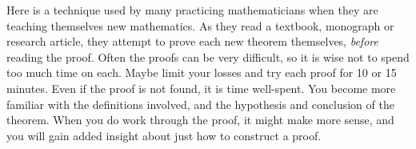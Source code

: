 \begin{para}Here is a technique used by many practicing mathematicians when they are teaching themselves new mathematics.  As they read a textbook, monograph or research article, they attempt to prove each new theorem themselves, {\em before} reading the proof.  Often the proofs can be very difficult, so it is wise not to spend too much time on each.  Maybe limit your losses and try each proof for 10 or 15 minutes.  Even if the proof is not found, it is time well-spent.  You become more familiar with the definitions involved, and the hypothesis and conclusion of the theorem.  When you do work through the proof, it might make more sense, and you will gain added insight about just how to construct a proof.\end{para}

